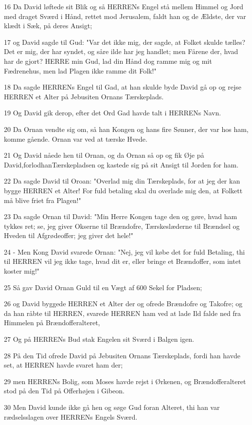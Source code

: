 \par 16 Da David løftede sit Blik og så HERRENs Engel stå mellem Himmel og Jord med draget Sværd i Hånd, rettet mod Jerusalem, faldt han og de Ældste, der var klædt i Sæk, på deres Ansigt;
\par 17 og David sagde til Gud: "Var det ikke mig, der sagde, at Folket skulde tælles? Det er mig, der har syndet, og såre ilde har jeg handlet; men Fårene der, hvad har de gjort? HERRE min Gud, lad din Hånd dog ramme mig og mit Fædrenehus, men lad Plagen ikke ramme dit Folk!"
\par 18 Da sagde HERRENs Engel til Gad, at han skulde byde David gå op og rejse HERREN et Alter på Jebusiten Ornans Tærskeplads.
\par 19 Og David gik derop, efter det Ord Gad havde talt i HERRENs Navn.
\par 20 Da Ornan vendte sig om, så han Kongen og hans fire Sønner, der var hos ham, komme gående. Ornan var ved at tærske Hvede.
\par 21 Og David nåede hen til Ornan, og da Ornan så op og fik Øje på David,forlodhanTærskepladsen og kastede sig på sit Ansigt til Jorden for ham.
\par 22 Da sagde David til Oroan: "Overlad mig din Tærskeplads, for at jeg der kan bygge HERREN et Alter! For fuld betaling skal du overlade mig den, at Folkett må blive friet fra Plagen!"
\par 23 Da sagde Ornan til David: "Min Herre Kongen tage den og gøre, hvad ham tykkes ret; se, jeg giver Okserne til Brændofre, Tærskeslæderne til Brændsel og Hveden til Afgrødeoffer; jeg giver det hele!"
\par 24 - Men Kong David svarede Ornan: "Nej, jeg vil købe det for fuld Betaling, thi til HERREN vil jeg ikke tage, hvad dit er, eller bringe et Brændoffer, som intet koster mig!"
\par 25 Så gav David Ornan Guld til en Vægt af 600 Sekel for Pladsen;
\par 26 og David byggede HERREN et Alter der og ofrede Brændofre og Takofre; og da han råbte til HERREN, svarede HERREN ham ved at lade Ild falde ned fra Himmelen på Brændofferalteret,
\par 27 Og på HERRENs Bud stak Engelen sit Sværd i Balgen igen.
\par 28 På den Tid ofrede David på Jebusiten Ornans Tærskeplads, fordi han havde set, at HERREN havde svaret ham der;
\par 29 men HERRENs Bolig, som Moses havde rejst i Ørkenen, og Brændofferalteret stod på den Tid på Offerhøjen i Gibeon.
\par 30 Men David kunde ikke gå hen og søge Gud foran Alteret, thi han var rædselsslagen over HERRENs Engels Sværd.

